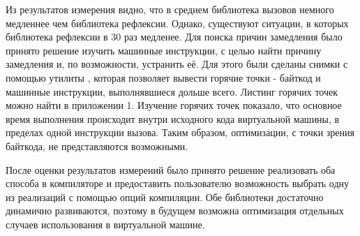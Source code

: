Из результатов измерения видно, что в среднем библиотека вызовов немного медленнее чем библиотека рефлексии. Однако, существуют ситуации, в которых библиотека рефлексии в 30 раз медленее. Для поиска причин замедления было принято решение изучить машинные инструкции, с целью найти причину замедления и, по возможности, устранить её. Для этого были сделаны снимки с помощью утилиты , которая позволяет вывести горячие точки - байткод и машинные инструкции, выполнявшиеся дольше всего. Листинг горячих точек можно найти в приложении 1. Изучение горячих точек показало, что основное время выполнения происходит внутри исходного кода виртуальной машины, в пределах одной инструкции вызова. Таким образом, оптимизации, с точки зрения байткода, не представляются возможными.

После оценки результатов измерений было принято решение реализовать оба способа в компиляторе и предоставить пользователю возможность выбрать одну из реализаций с помощью опций компиляции. Обе библиотеки достаточно динамично развиваются, поэтому в будущем возможна оптимизация отдельных случаев использования в виртуальной машине.
